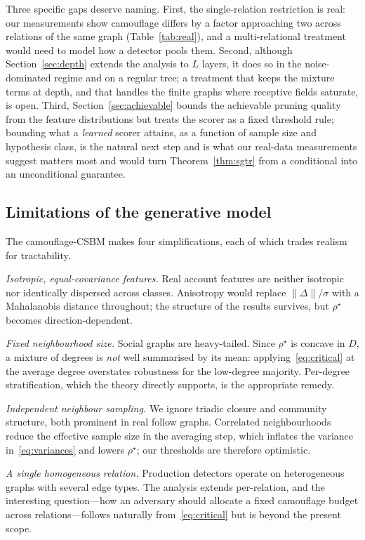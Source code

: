 \documentclass[../elsevier.tex]{subfiles}
\begin{document}
Three specific gaps deserve naming. First, the single-relation restriction is real: our measurements show camouflage
differs by a factor approaching two across relations of the same graph
(Table~\ref{tab:real}), and a multi-relational treatment would need to model how a
detector pools them. Second, although Section~\ref{sec:depth} extends the analysis
to $L$ layers, it does so in the noise-dominated regime and on a regular tree; a
treatment that keeps the mixture terms at depth, and that handles the finite graphs
where receptive fields saturate, is open. Third, Section~\ref{sec:achievable} bounds
the achievable pruning quality from the feature distributions but treats the scorer
as a fixed threshold rule; bounding what a \emph{learned} scorer attains, as a
function of sample size and hypothesis class, is the natural next step and is what
our real-data measurements suggest matters most and would
turn Theorem~\ref{thm:sgtr} from a conditional into an unconditional guarantee.\subsection{Limitations of the generative model}
\label{sec:limitations}

The camouflage-CSBM makes four simplifications, each of which trades realism for
tractability.

\emph{Isotropic, equal-covariance features.} Real account features are neither
isotropic nor identically dispersed across classes. Anisotropy would replace
$\|\Delta\|/\sigma$ with a Mahalanobis distance throughout; the structure of the
results survives, but $\rho^\star$ becomes direction-dependent.

\emph{Fixed neighbourhood size.} Social graphs are heavy-tailed. Since $\rho^\star$
is concave in $D$, a mixture of degrees is \emph{not} well summarised by its mean:
applying~\eqref{eq:critical} at the average degree overstates robustness for the
low-degree majority. Per-degree stratification, which the theory directly supports,
is the appropriate remedy.

\emph{Independent neighbour sampling.} We ignore triadic closure and community
structure, both prominent in real follow graphs. Correlated neighbourhoods reduce
the effective sample size in the averaging step, which inflates the variance
in~\eqref{eq:variances} and lowers $\rho^\star$; our thresholds are therefore
optimistic.

\emph{A single homogeneous relation.} Production detectors operate on
heterogeneous graphs with several edge types. The analysis extends per-relation,
and the interesting question---how an adversary should allocate a fixed camouflage
budget across relations---follows naturally from~\eqref{eq:critical} but is beyond
the present scope.
\end{document}
